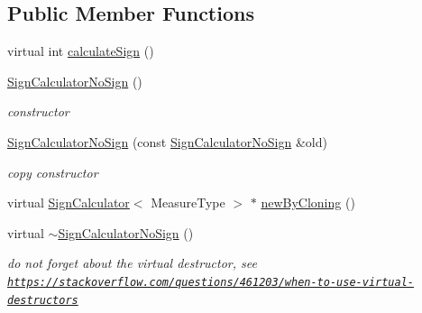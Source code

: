 \subsection*{Public Member Functions}
\begin{DoxyCompactItemize}
\item 
virtual int \hyperlink{class_ox_1_1_sign_calculator_no_sign_a8e78a82d817f66385d1a2140f8ef11d7}{calculate\+Sign} ()
\item 
\hyperlink{class_ox_1_1_sign_calculator_no_sign_ad61e381c257ac4b4f615d94461dc49b1}{Sign\+Calculator\+No\+Sign} ()\hypertarget{class_ox_1_1_sign_calculator_no_sign_ad61e381c257ac4b4f615d94461dc49b1}{}\label{class_ox_1_1_sign_calculator_no_sign_ad61e381c257ac4b4f615d94461dc49b1}

\begin{DoxyCompactList}\small\item\em constructor \end{DoxyCompactList}\item 
\hyperlink{class_ox_1_1_sign_calculator_no_sign_af7d02fdbe8062421741d00f60c9e57aa}{Sign\+Calculator\+No\+Sign} (const \hyperlink{class_ox_1_1_sign_calculator_no_sign}{Sign\+Calculator\+No\+Sign} \&old)\hypertarget{class_ox_1_1_sign_calculator_no_sign_af7d02fdbe8062421741d00f60c9e57aa}{}\label{class_ox_1_1_sign_calculator_no_sign_af7d02fdbe8062421741d00f60c9e57aa}

\begin{DoxyCompactList}\small\item\em copy constructor \end{DoxyCompactList}\item 
virtual \hyperlink{class_ox_1_1_sign_calculator}{Sign\+Calculator}$<$ Measure\+Type $>$ $\ast$ \hyperlink{class_ox_1_1_sign_calculator_no_sign_ac480086ad668ac264393b1b18a926221}{new\+By\+Cloning} ()
\item 
virtual \hyperlink{class_ox_1_1_sign_calculator_no_sign_a1da2b6c351daf89811c6d9618df2bb74}{$\sim$\+Sign\+Calculator\+No\+Sign} ()\hypertarget{class_ox_1_1_sign_calculator_no_sign_a1da2b6c351daf89811c6d9618df2bb74}{}\label{class_ox_1_1_sign_calculator_no_sign_a1da2b6c351daf89811c6d9618df2bb74}

\begin{DoxyCompactList}\small\item\em do not forget about the virtual destructor, see \href{https://stackoverflow.com/questions/461203/when-to-use-virtual-destructors}{\tt https\+://stackoverflow.\+com/questions/461203/when-\/to-\/use-\/virtual-\/destructors} \end{DoxyCompactList}\end{DoxyCompactItemize}

